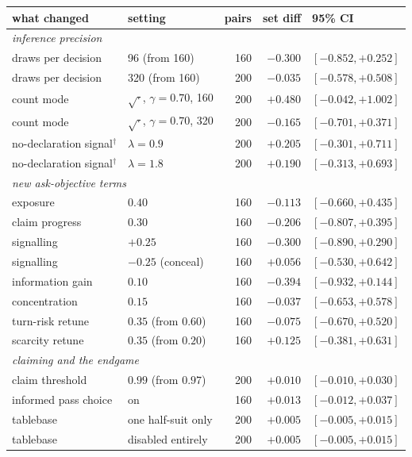 \documentclass[11pt,a4paper]{article}
\begin{document}
\begin{table}[t]
\centering
\small
\begin{tabular}{llrrl}
\toprule
what changed & setting & pairs & set diff & 95\% CI \\
\midrule
\multicolumn{5}{l}{\emph{inference precision}}\\
draws per decision & 96 (from 160) & 160 & $-0.300$ & $[-0.852, +0.252]$ \\
draws per decision & 320 (from 160) & 200 & $-0.035$ & $[-0.578, +0.508]$ \\
count mode & $\sqrt{\cdot}$, $\gamma{=}0.70$, 160 & 200 & $+0.480$ & $[-0.042, +1.002]$ \\
count mode & $\sqrt{\cdot}$, $\gamma{=}0.70$, 320 & 200 & $-0.165$ & $[-0.701, +0.371]$ \\
no-declaration signal$^\dagger$ & $\lambda = 0.9$ & 200 & $+0.205$ & $[-0.301, +0.711]$ \\
no-declaration signal$^\dagger$ & $\lambda = 1.8$ & 200 & $+0.190$ & $[-0.313, +0.693]$ \\
\midrule
\multicolumn{5}{l}{\emph{new ask-objective terms}}\\
exposure & $0.40$ & 160 & $-0.113$ & $[-0.660, +0.435]$ \\
claim progress & $0.30$ & 160 & $-0.206$ & $[-0.807, +0.395]$ \\
signalling & $+0.25$ & 160 & $-0.300$ & $[-0.890, +0.290]$ \\
signalling & $-0.25$ (conceal) & 160 & $+0.056$ & $[-0.530, +0.642]$ \\
information gain & $0.10$ & 160 & $-0.394$ & $[-0.932, +0.144]$ \\
concentration & $0.15$ & 160 & $-0.037$ & $[-0.653, +0.578]$ \\
turn-risk retune & $0.35$ (from $0.60$) & 160 & $-0.075$ & $[-0.670, +0.520]$ \\
scarcity retune & $0.35$ (from $0.20$) & 160 & $+0.125$ & $[-0.381, +0.631]$ \\
\midrule
\multicolumn{5}{l}{\emph{claiming and the endgame}}\\
claim threshold & $0.99$ (from $0.97$) & 200 & $+0.010$ & $[-0.010, +0.030]$ \\
informed pass choice & on & 160 & $+0.013$ & $[-0.012, +0.037]$ \\
tablebase & one half-suit only & 200 & $+0.005$ & $[-0.005, +0.015]$ \\
tablebase & disabled entirely & 200 & $+0.005$ & $[-0.005, +0.015]$ \\

\end{tabular}
\end{table}
\end{document}
